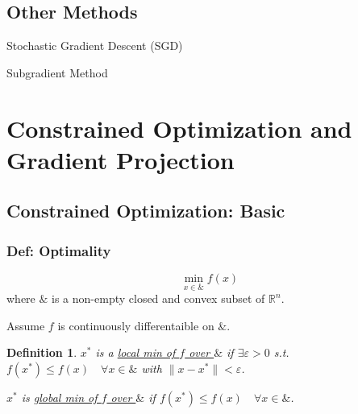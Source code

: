 \documentclass[11pt,a4paper]{article}
\newtheorem{definition}{Definition}
\begin{document}
\subsection{Other Methods}
Stochastic Gradient Descent (SGD)

Subgradient Method






















\section{Constrained Optimization and Gradient Projection}
\subsection{Constrained Optimization: Basic}
\subsubsection{Def: Optimality}
$$\min_{x\in \&} f(x)$$
where $\&$ is a non-empty closed and convex subset of $\mathbb{R}^n$.

Assume $f$ is continuously differentaible on $\&$.

\begin{definition}
$x^*$ is a \underline{local min of $f$ over $\&$} if $\exists \varepsilon>0$ s.t. $f(x^*)\leq f(x)\quad \forall x\in \&$ with $\|x-x^*\|<\varepsilon$.

$x^*$ is \underline{global min of $f$ over $\&$} if $f(x^*)\leq f(x)\quad \forall x\in \&$.
\end{definition}
\end{document}

